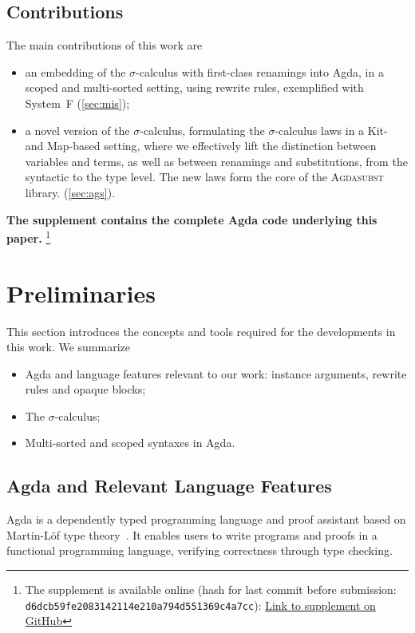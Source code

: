 \documentclass[screen,nonacm]{acmart}
\begin{document}
\subsection*{Contributions}
The main contributions of this work are
\begin{itemize}
      \item an embedding of the $σ$-calculus with first-class renamings into Agda, in a
            scoped and multi-sorted setting, using rewrite rules, exemplified with System~F
            (\cref{sec:mis});
      \item a novel version of the $σ$-calculus, formulating the $σ$-calculus laws in a
            Kit- and Map-based setting, where we effectively lift the distinction between
            variables and terms, as well as between renamings and substitutions, from the
            syntactic to the type level. The new laws form the core of the
            \textsc{Agdasubst} library. (\cref{sec:ags}).
\end{itemize}

\noindent\textbf{The supplement contains the complete Agda code underlying this paper.}
\footnote{The supplement is available online (hash for last commit before submission: \texttt{d6dcb59fe2083142114e210a794d551369c4a7cc}): \href{https://github.com/Mari-W/Agdasubst}{Link to supplement on GitHub}}

\section{Preliminaries}\label{sec:pre}
This section introduces the concepts and tools required for the developments in
this work. We summarize
\begin{itemize}
      \item Agda and language features relevant to our work: instance arguments, rewrite
            rules and opaque blocks;
      \item The $σ$-calculus;
      \item Multi-sorted and scoped syntaxes in Agda.
\end{itemize}

\subsection{Agda and Relevant Language Features}\label{sec:pre-agd}
Agda is a dependently typed programming language and proof assistant based on
Martin-Löf type theory~\cite{MARTINLOF197573}. It enables users to write
programs and proofs in a functional programming language, verifying correctness
through type checking.
\end{document}
